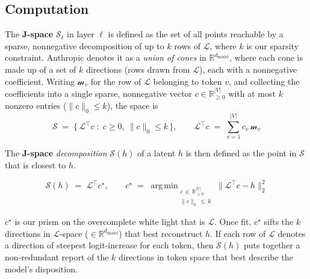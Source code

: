 \documentclass{article}
\newcommand{\jlens}{\mathscr{L}}
\newcommand{\jspace}{\mathscr{S}}
\newcommand{\dmodel}{d_{\text{model}}}
\DeclareMathOperator*{\argmin}{arg\,min}
\begin{document}
\subsection{Computation}\label{sec:jspacecomp}

The \textbf{J-space} \(\jspace_\ell\) in layer \(\ell\) is defined as the set of all points reachable by a sparse, nonnegative decomposition of up to \(k\) rows of \(\jlens\), where \(k\) is our sparsity constraint. Anthropic denotes it as a \textit{union of cones} in \(\mathbb{R}^{\dmodel}\), where each cone is made up of a set of \(k\) directions (rows drawn from \(\jlens\)), each with a nonnegative coefficient. Writing \(\mathscr{m}_{v}\) for the row of \(\jlens\) belonging to token \(v\), and collecting the coefficients into a single sparse, nonnegative vector \(c \in \mathbb{R}^{|V|}_{\ge 0}\) with at most \(k\) nonzero entries (\(\|c\|_0 \le k\)), the space is
\[ \jspace \;=\; \bigl\{\, \jlens^{\!\top} c \;:\; c \ge 0,\ \|c\|_0 \le k \,\bigr\}, \qquad \jlens^{\!\top} c \;=\; \sum_{v=1}^{|V|} c_v\, \mathscr{m}_{v} \]

The \textbf{J-space} \textit{decomposition} \(\jspace(h)\) of a latent \(h\) is then defined as the point in \(\jspace\) that is closest to \(h\).

\[ \jspace(h) \;=\; \jlens^{\!\top} c^\star, \qquad c^\star \;=\; \argmin_{\substack{c \,\in\, \mathbb{R}^{|V|}_{\ge 0} \\ \|c\|_0 \,\le\, k}} \bigl\| \jlens^{\!\top} c - h \bigr\|_2^2  \]

\(c^\star\) is our prism on the overcomplete white light that is \(\jlens\). Once fit, \(c^\star\) sifts the \(k\) directions in \(\jlens\)-space (\(\in \mathbb{R}^{\dmodel}\)) that best reconstruct \(h\). If each row of \(\jlens\) denotes a direction of steepest logit-increase for each token, then \(\jspace(h)\) puts together a non-redundant report of the \(k\) directions in token space that best describe the model's disposition.
\end{document}
